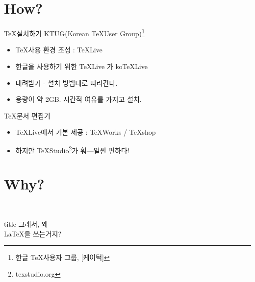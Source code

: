 \documentclass[12pt]{beamer}
\begin{document}
\section{How?}
\begin{frame}{\TeX 설치하기}
	KTUG(Korean \TeX User Group)\footnote{한글 \TeX 사용자 그룹, [케이턱]}
	\begin{itemize}
		\item \TeX 사용 환경 조성 : TeXLive
		\item 한글을 사용하기 위한 TeXLive 가 koTeXLive
		\item 내려받기 - 설치 방법대로 따라간다.
		\item 용량이 약 2GB. 시간적 여유를 가지고 설치.
	\end{itemize}
	\TeX 문서 편집기
	\begin{itemize}
		\item TeXLive에서 기본 제공 : TeXWorks / TeXshop
		\item 하지만 TeXStudio\footnote{texstudio.org}가 훠---얼씬 편하다!
	\end{itemize}
\end{frame}
\section{Why?}
\begin{frame}{~}
	\vfill
	\centering
	\begin{beamercolorbox}[sep=8pt,center,shadow=true,rounded=true]{title}
		\Huge 그래서, 왜 \\ \LaTeX 을 쓰는거지?
	\end{beamercolorbox}
	\vfill
\end{frame}
\end{document}
